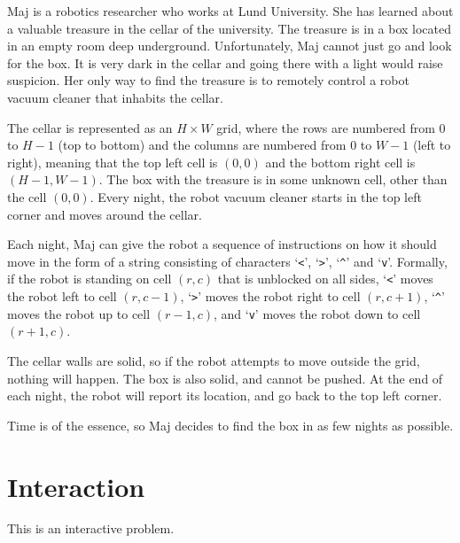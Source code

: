 Maj is a robotics researcher who works at Lund University.
She has learned about a valuable treasure in the cellar of the university.
The treasure is in a box located in an empty room deep underground.
Unfortunately, Maj cannot just go and look for the box. It is very dark in the
cellar and going there with a light would raise suspicion. Her only way to
find the treasure is to remotely control a robot vacuum cleaner that inhabits the cellar.

The cellar is represented as an $H \times W$ grid, where the rows are numbered from $0$ to $H-1$ (top to bottom) 
and the columns are numbered from $0$ to $W-1$ (left to right), meaning that the top left cell is $(0, 0)$
and the bottom right cell is $(H-1, W-1)$.
The box with the treasure is in some unknown cell, other than the cell $(0,0)$.
Every night, the robot vacuum cleaner starts in the top left corner and moves around the cellar.

Each night, Maj can give the robot a sequence of instructions on how it should move in the form of a string consisting of characters 
`\verb!<!', `\verb!>!', `\verb!^!' and `\verb!v!'.
Formally, if the robot is standing on cell $(r, c)$ that is unblocked on all sides, `\verb!<!' moves the robot left to cell $(r, c-1)$, 
`\verb!>!' moves the robot right to cell $(r, c+1)$, `\verb!^!' moves the robot up to cell $(r-1, c)$, and `\verb!v!' moves the robot down to cell $(r+1, c)$.

The cellar walls are solid, so if the robot attempts to move outside the grid, nothing will happen.
The box is also solid, and cannot be pushed. At the end of each night, the robot will report its location, and go back to the top left corner.

Time is of the essence, so Maj decides to find the box in as few nights as possible.

\section*{Interaction}
This is an interactive problem.

